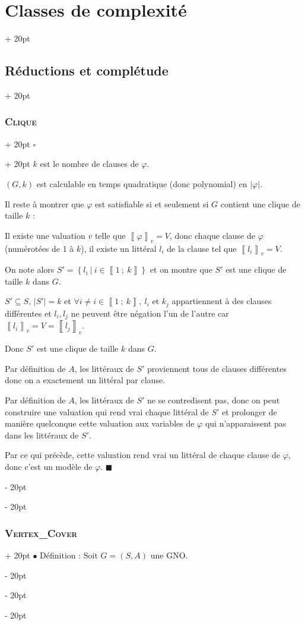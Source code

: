\documentclass[a4paper, 12pt, twoside]{article}
\newcommand{\nset}[2]{\left\llbracket #1\ ;\ #2 \right\rrbracket}
\newcommand{\lrbb}[1]{\left\llbracket #1 \right\rrbracket}
\newcommand{\set}[1]{\left\{ #1 \right\}}
\newcommand{\abs}[1]{\left\lvert #1 \right\rvert}
\newcommand{\ind}[1][20pt]{\advance\leftskip + #1}
\newcommand{\deind}[1][20pt]{\advance\leftskip - #1}
\newenvironment{indt}[2][20pt]{#2 \par \ind[#1]}{\par \deind} %
\newenvironment{proof}[1][{}]{\begin{indt}{$\square$ #1}}{$\blacksquare$ \end{indt}}
\begin{document}
\begin{indt}{\section{Classes de complexité}}
\begin{indt}{\subsection{Réductions et complétude}}
\begin{indt}{\subsubsection{\textsc{Clique}}}
\begin{proof}
                    $k$ est le nombre de clauses de $\varphi$.

                    $(G, k)$ est calculable en temps quadratique (donc polynomial) en $\abs \varphi$.

                    \vspace{6pt}
                    
                    Il reste à montrer que $\varphi$ est satisfiable si et seulement si $G$ contient une clique de taille $k$ :

                    \boxed{\Rightarrow} Il existe une valuation $v$ telle que $\lrbb \varphi _v = V$, donc chaque clause de $\varphi$ (numérotées de 1 à $k$), il existe un littéral $l_i$ de la clause tel que $\lrbb{l_i}_v = V$.

                    On note alors $S' = \set{l_i\ |\ i \in \nset 1 k}$ et on montre que $S'$ est une clique de taille $k$ dans $G$.

                    $S' \subseteq S$, $\abs{S'} = k$ et $\forall i \neq i \in \nset 1 k,\ l_i$ et $k_j$ appartiennent à des clauses différentes et $l_i, l_j$ ne peuvent être négation l'un de l'autre car  $\lrbb{l_i}_v = V = \lrbb{l_j}_v$.

                    Donc $S'$ est une clique de taille $k$ dans $G$.

                    \vspace{6pt}
                    
                    \boxed{\Leftarrow}
                    Par définition de $A$, les littéraux de $S'$ proviennent tous de clauses différentes donc on a exactement un littéral par clause.

                    Par définition de $A$, les littéraux de $S'$ ne se contredisent pas, donc on peut construire une valuation qui rend vrai chaque littéral de $S'$ et prolonger de manière quelconque cette valuation aux variables de $\varphi$ qui n'apparaissent pas dans les littéraux de $S'$.

                    Par ce qui précède, cette valuation rend vrai un littéral de chaque clause de $\varphi$, donc c'est un modèle de $\varphi$.
                \end{proof}
            \end{indt}

            \vspace{12pt}
            
            \begin{indt}{\subsubsection{\textsc{Vertex\_Cover}}}
                $\bullet$ Définition : Soit $G = (S, A)$ une GNO.


\end{indt}
\end{indt}
\end{indt}
\end{document}
